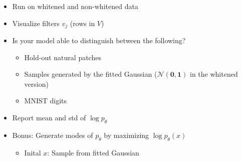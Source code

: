 \documentclass[a4paper]{article}
\begin{document}
\begin{itemize}
\item Run on whitened and non-whitened data

\item Visualize filters $v_j$ (rows in $V$)

\item Is your model able to distinguish between the following?
\begin{itemize}
\item Hold-out natural patches
\item Samples generated by the fitted Gaussian ($\mathcal{N}(\boldsymbol{0},\boldsymbol{1})$ in the whitened version)
\item MNIST digits
\end{itemize}

\item Report mean and std of $\log p_\theta$

\item Bonus: Generate modes of $p_\theta$ by maximizing $\log p_\theta(x)$
\begin{itemize}
\item Inital $x$: Sample from fitted Gaussian
\end{itemize}
\end{itemize}


\newpage
\end{document}
